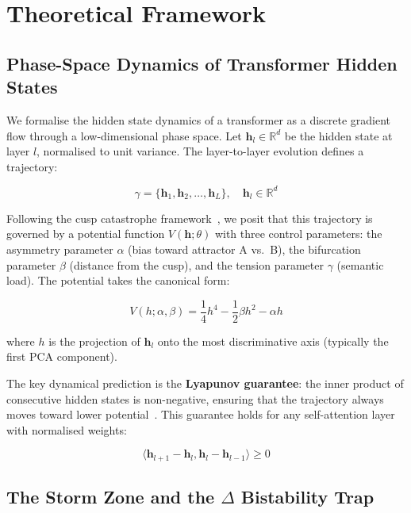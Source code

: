\documentclass[12pt,a4paper]{article}
\begin{document}
\section{Theoretical Framework}

\subsection{Phase-Space Dynamics of Transformer Hidden States}

We formalise the hidden state dynamics of a transformer as a discrete gradient flow through a low-dimensional phase space. Let $\mathbf{h}_l \in \mathbb{R}^d$ be the hidden state at layer $l$, normalised to unit variance. The layer-to-layer evolution defines a trajectory:

\begin{equation}
    \gamma = \{\mathbf{h}_1, \mathbf{h}_2, \ldots, \mathbf{h}_L\}, \quad \mathbf{h}_l \in \mathbb{R}^d
    \label{eq:trajectory}
\end{equation}

Following the cusp catastrophe framework~\cite{DR_MM_2025b}, we posit that this trajectory is governed by a potential function $V(\mathbf{h}; \theta)$ with three control parameters: the asymmetry parameter $\alpha$ (bias toward attractor A vs.~B), the bifurcation parameter $\beta$ (distance from the cusp), and the tension parameter $\gamma$ (semantic load). The potential takes the canonical form:

\begin{equation}
    V(h; \alpha, \beta) = \frac{1}{4}h^4 - \frac{1}{2}\beta h^2 - \alpha h
    \label{eq:cusp_potential}
\end{equation}

where $h$ is the projection of $\mathbf{h}_l$ onto the most discriminative axis (typically the first PCA component).

The key dynamical prediction is the \textbf{Lyapunov guarantee}: the inner product of consecutive hidden states is non-negative, ensuring that the trajectory always moves toward lower potential~\cite{DR_MM_2025a}. This guarantee holds for any self-attention layer with normalised weights:

\begin{equation}
    \langle \mathbf{h}_{l+1} - \mathbf{h}_l, \mathbf{h}_l - \mathbf{h}_{l-1} \rangle \geq 0
    \label{eq:lyapunov}
\end{equation}

\subsection{The Storm Zone and the $\Delta$ Bistability Trap}
\end{document}
